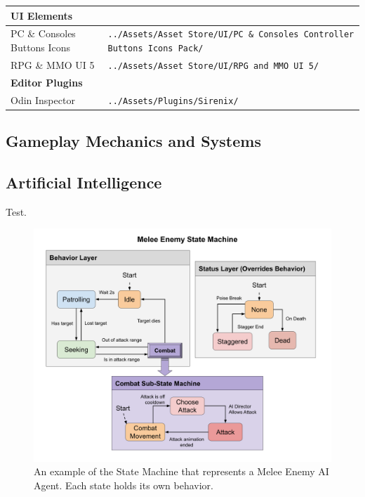 \documentclass[cic,tc,english]{iiufrgs}
\begin{document}
\begin{table}[h!]
\begin{center}
\begin{tabular}{ m{10em} m{20em} }
      \hline \multicolumn{2}{l|}{\textbf{UI Elements}} \\ \hline
      PC \& Consoles Buttons Icons  & \texttt{../Assets/Asset Store/UI/PC \& Consoles Controller Buttons Icons Pack/} \\ \hline
      RPG \& MMO UI 5               & \texttt{../Assets/Asset Store/UI/RPG and MMO UI 5/} \\

      \hline \multicolumn{2}{l|}{\textbf{Editor Plugins}} \\ \hline
      Odin Inspector                & \texttt{../Assets/Plugins/Sirenix/} \\

    \end{tabular}
  \end{center}
\end{table}

\subsection{Gameplay Mechanics and Systems}

\subsection{Artificial Intelligence}

Test.

\begin{figure}[!h]
    \caption{An example of the State Machine that represents a Melee Enemy AI Agent. Each state holds its own behavior.}
    \begin{center}
        \includegraphics[width=40em]{figures/fig-melee-ai-state-machine.png}
    \end{center}
    \label{fig:ex1}
\end{figure}
\end{document}
